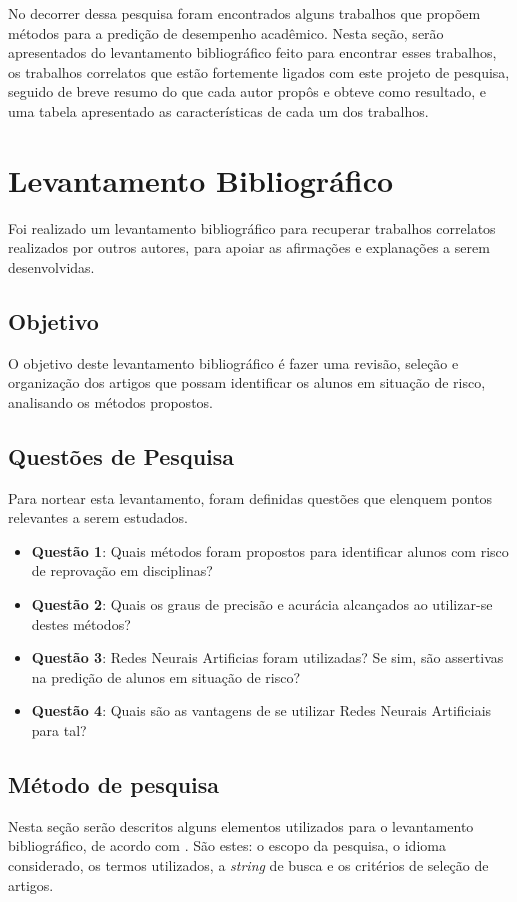 No decorrer dessa pesquisa foram encontrados alguns trabalhos que propõem métodos para a predição de desempenho acadêmico. Nesta seção, serão apresentados do levantamento bibliográfico feito para encontrar esses trabalhos, os trabalhos correlatos que estão fortemente ligados com este projeto de pesquisa, seguido de breve resumo do que cada autor propôs e obteve como resultado, e uma tabela apresentado as  características de cada um dos trabalhos.

\section{Levantamento Bibliográfico} \label{sec:Lev}
Foi realizado um levantamento bibliográfico para recuperar trabalhos correlatos realizados por outros autores, para apoiar as afirmações e explanações a serem desenvolvidas.

\subsection{Objetivo}
\label{sec:Obj}
O objetivo deste levantamento bibliográfico é fazer uma revisão, seleção e organização dos artigos que possam identificar os alunos em situação de risco, analisando os métodos propostos.

\subsection{Questões de Pesquisa}
\label{sec:QP}
Para nortear esta levantamento, foram definidas questões que elenquem pontos relevantes a serem estudados.
\begin{itemize}
    \item \textbf{Questão 1}: Quais métodos foram propostos para identificar alunos com risco de reprovação em disciplinas?
    \item \textbf{Questão 2}: Quais os graus de precisão e acurácia alcançados ao utilizar-se destes métodos?
    \item \textbf{Questão 3}: Redes Neurais Artificias foram utilizadas? Se sim, são assertivas na predição de alunos em situação de risco?
    \item \textbf{Questão 4}: Quais são as vantagens de se utilizar Redes Neurais Artificiais para tal?
\end{itemize}

\subsection{Método de pesquisa} \label{sec:MP}
Nesta seção serão descritos alguns elementos utilizados para o levantamento bibliográfico, de acordo com . São estes: o escopo da pesquisa, o idioma considerado, os termos utilizados, a \textit{string} de busca e os critérios de seleção de artigos.


